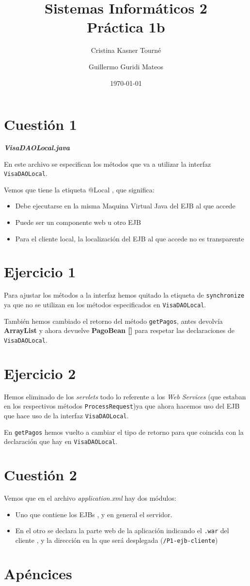 \documentclass[a4paper, 10pt]{article}
\title{Sistemas Informáticos 2\\Práctica 1b}
\author{Cristina Kasner Tourné\and Guillermo Guridi Mateos}
\date{\today}
\begin{document}
\maketitle
\newpage

\section{Cuestión 1}\textit{\textbf{VisaDAOLocal.java}}


En este archivo se especifican los métodos que va a utilizar la interfaz \texttt{VisaDAOLocal}.


Vemos que tiene la etiqueta @Local , que significa:
\begin{itemize}
	\item Debe ejecutarse en la misma Maquina Virtual Java del EJB al que accede
	\item Puede ser un componente web u otro EJB
	\item Para el cliente local, la localización del EJB al que accede no es transparente
\end{itemize}

\section{Ejercicio 1}

Para ajustar los métodos a la interfaz hemos quitado la etiqueta de \texttt{synchronize} ya que no se utilizan en los métodos especificados en \texttt{VisaDAOLocal}.

También hemos cambiado el retorno del método \texttt{getPagos}, antes devolvía \textbf{ArrayList} y ahora devuelve \textbf{PagoBean []} para respetar las declaraciones de \texttt{VisaDAOLocal}.

\section{Ejercicio 2}
Hemos eliminado de los \textit{servlets} todo lo referente a los \textit{Web Services} (que estaban en los respectivos métodos \texttt{ProcessRequest})ya que ahora hacemos uso del EJB que hace uso de la interfaz \texttt{VisaDAOLocal}.

En \texttt{getPagos} hemos vuelto a cambiar el tipo de retorno para que coincida con la declaración que hay en \texttt{VisaDAOLocal}.
\section{Cuestión 2}
Vemos que en el archivo \textit{application.xml} hay dos módulos:
\begin{itemize}
	\item Uno que contiene los EJBs , y en general el servidor.
	\item En el otro se declara la parte web de la aplicación indicando el \texttt{.war} del cliente , y la dirección en la que será desplegada (\texttt{/P1-ejb-cliente})
 \end{itemize}
\newpage
\appendix
\section{Apéncices}
\end{document}

